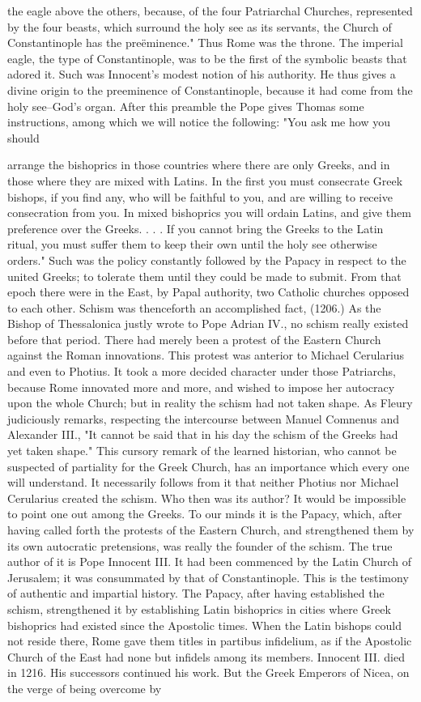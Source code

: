the eagle above the others, because, of the four Patriarchal Churches, represented by the four beasts, which surround the holy see as its servants, the Church of Constantinople has the preëminence." Thus Rome was the throne. The imperial eagle, the type of Constantinople, was to be the first of the symbolic beasts that adored it. Such was Innocent's modest notion of his authority. He thus gives a divine origin to the preeminence of Constantinople, because it had come from the holy see--God's organ. After this preamble the Pope gives Thomas some instructions, among which we will notice the following: "You ask me how you should

arrange the bishoprics in those countries where there are only Greeks, and in those where they are mixed with Latins. In the first you must consecrate Greek bishops, if you find any, who will be faithful to you, and are willing to receive consecration from you. In mixed bishoprics you will ordain Latins, and give them preference over the Greeks. . . . If you cannot bring the Greeks to the Latin ritual, you must suffer them to keep their own until the holy see otherwise orders." Such was the policy constantly followed by the Papacy in respect to the united Greeks; to tolerate them until they could be made to submit. From that epoch there were in the East, by Papal authority, two Catholic churches opposed to each other. Schism was thenceforth an accomplished fact, (1206.) As the Bishop of Thessalonica justly wrote to Pope Adrian IV., no schism really existed before that period. There had merely been a protest of the Eastern Church against the Roman innovations. This protest was anterior to Michael Cerularius and even to Photius. It took a more decided character under those Patriarchs, because Rome innovated more and more, and wished to impose her autocracy upon the whole Church; but in reality the schism had not taken shape. As Fleury judiciously remarks, respecting the intercourse between Manuel Comnenus and Alexander III., "It cannot be said that in his day the schism of the Greeks had yet taken shape." This cursory remark of the learned historian, who cannot be suspected of partiality for the Greek Church, has an importance which every one will understand. It necessarily follows from it that neither Photius nor Michael Cerularius created the schism. Who then was its author? It would be impossible to point one out among the Greeks. To our minds it is the Papacy, which, after having called forth the protests of the Eastern Church, and strengthened them by its own autocratic pretensions, was really the founder of the schism. The true author of it is Pope Innocent III. It had been commenced by the Latin Church of Jerusalem; it was consummated by that of Constantinople. This is the testimony of authentic and impartial history. The Papacy, after having established the schism, strengthened it by establishing Latin bishoprics in cities where Greek bishoprics had existed since the Apostolic times. When the Latin bishops could not reside there, Rome gave them titles in partibus infidelium, as if the Apostolic Church of the East had none but infidels among its members. Innocent III. died in 1216. His successors continued his work. But the Greek Emperors of Nicea, on the verge of being overcome by 